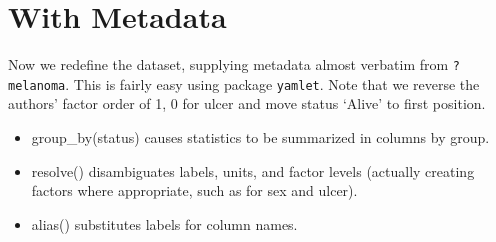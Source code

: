 \documentclass[]{article}
\newenvironment{Shaded}{\begin{snugshade}}{\end{snugshade}}
\newcommand{\DataTypeTok}[1]{\textcolor[rgb]{0.13,0.29,0.53}{#1}}
\newcommand{\KeywordTok}[1]{\textcolor[rgb]{0.13,0.29,0.53}{\textbf{#1}}}
\newcommand{\NormalTok}[1]{#1}
\newcommand{\OperatorTok}[1]{\textcolor[rgb]{0.81,0.36,0.00}{\textbf{#1}}}
\newcommand{\StringTok}[1]{\textcolor[rgb]{0.31,0.60,0.02}{#1}}
\begin{document}
\hypertarget{with-metadata}{%
\section{With Metadata}\label{with-metadata}}

Now we redefine the dataset, supplying metadata almost verbatim from
\texttt{?melanoma}. This is fairly easy using package \texttt{yamlet}.
Note that we reverse the authors' factor order of 1, 0 for ulcer and
move status `Alive' to first position.

\begin{Shaded}
\end{Shaded}

\begin{itemize}
\item
  group\_by(status) causes statistics to be summarized in columns by
  group.
\item
  resolve() disambiguates labels, units, and factor levels (actually
  creating factors where appropriate, such as for sex and ulcer).
\item
  alias() substitutes labels for column names.
\end{itemize}
\end{document}
